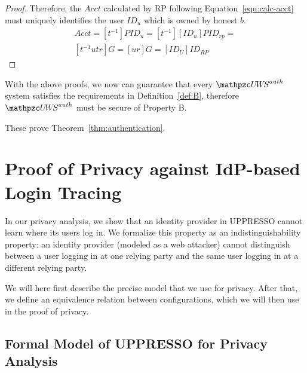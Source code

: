 \begin{proof}
    Therefore, the $Acct$ calculated by RP following Equation~\ref{equ:calc-acct} must uniquely identifies the user $ID_u$ which is owned by honest $b$.  
    \oldc
    \begin{equation}\label{equ:calc-acct}
      \begin{split}
      Acct=[t^{-1}]PID_u=[t^{-1}][ID_u]PID_{rp}=\\
      [t^{-1}utr]G =[ur]G=[ID_U]ID_{RP}
      \end{split}
    \end{equation}
  \end{proof}

 
  With the above proofs, we now can guarantee that every 
  $\uppressoauthwebsystem$ system satisfies the requirements in 
  Definition~\ref{def:B}, therefore $\uppressoauthwebsystem$ 
  must be secure of Property B.
  
  These prove Theorem~\ref{thm:authentication}.\QED
  
  \section{Proof of Privacy against IdP-based Login Tracing}
  
  In our privacy analysis, we show that an identity provider in UPPRESSO cannot learn 
  where its users log in. We formalize this property as an indistinguishability 
  property: an identity provider (modeled as a web attacker) cannot distinguish 
  between a user logging in at one relying party and the same user logging in at 
  a different relying party.
  
  We will here first describe the precise model that we use for privacy.
  After that, we define an equivalence relation between configurations,
  which we will then use in the proof of privacy.
  
  \subsection{Formal Model of UPPRESSO for Privacy Analysis}
  
